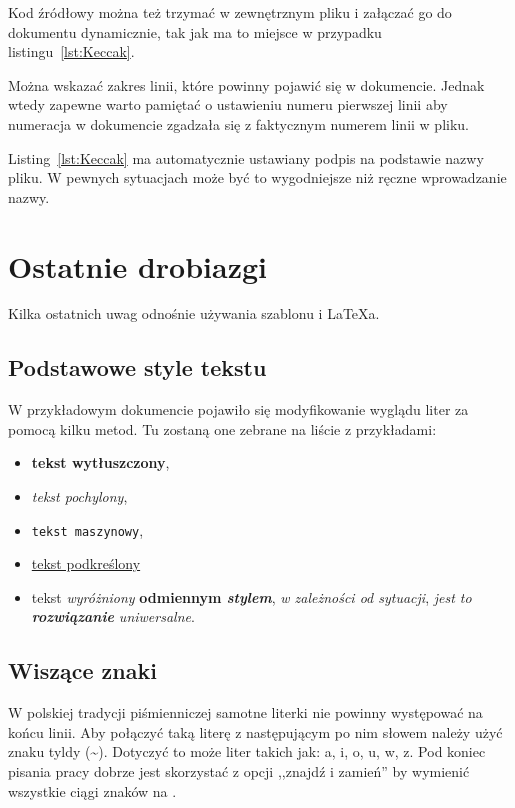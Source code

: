 Kod źródłowy można też trzymać w zewnętrznym pliku i załączać go do dokumentu dynamicznie, tak jak ma to miejsce w przypadku listingu~\ref{lst:Keccak}.

Można wskazać zakres linii, które powinny pojawić się w dokumencie. Jednak wtedy zapewne warto pamiętać o ustawieniu numeru pierwszej linii aby numeracja w dokumencie zgadzała się z faktycznym numerem linii w pliku.

Listing~\ref{lst:Keccak} ma automatycznie ustawiany podpis na podstawie nazwy pliku. W pewnych sytuacjach może być to wygodniejsze niż ręczne wprowadzanie nazwy.



\section{Ostatnie drobiazgi}
Kilka ostatnich uwag odnośnie używania szablonu i \LaTeX{a}.

\subsection{Podstawowe style tekstu}
W przykładowym dokumencie pojawiło się modyfikowanie wyglądu liter za pomocą kilku metod. Tu zostaną one zebrane na liście z przykładami:
\begin{itemize}
    \item \textbf{tekst wytłuszczony},
    \item \textit{tekst pochylony},
    \item \texttt{tekst maszynowy},
    \item \underline{tekst podkreślony}
    \item tekst \emph{wyróżniony} \textbf{odmiennym \emph{stylem}}, \textit{w zależności \emph{od sytuacji}}, \emph{jest to \textbf{rozwiązanie} \textit{uniwersalne}}.
\end{itemize}

\subsection{Wiszące znaki}
W polskiej tradycji piśmienniczej samotne literki nie powinny występować na końcu linii. Aby połączyć taką literę z następującym po nim słowem należy użyć znaku tyldy (\textasciitilde{}). Dotyczyć to może liter takich jak: a, i, o, u, w, z. Pod koniec pisania pracy dobrze jest skorzystać z opcji ,,znajdź i zamień'' by wymienić wszystkie ciągi znaków  na .


